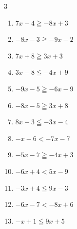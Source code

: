 \begin{multicols}{3}
\begin{enumerate}
  \item $7x-4\geqq -8x+3$


  \item $-8x-3\geqq -9x-2$

        \phantom{$\displaystyle x\geqq 1$}

  \item $7x+8\geqq 3x+3$


  \item $3x-8\leqq -4x+9$


  \item $-9x-5\geqq -6x-9$


  \item $-8x-5\geqq 3x+8$


  \item $8x-3\leqq -3x-4$


  \item $-x-6<-7x-7$


  \item $-5x-7\geqq -4x+3$

        \phantom{$\displaystyle x\leqq -10$}

  \item $-6x+4<5x-9$


  \item $-3x+4\leqq 9x-3$


  \item $-6x-7<-8x+6$


\columnbreak %

  \item $-x+1\leqq 9x+5$



\end{enumerate}
\end{multicols}
